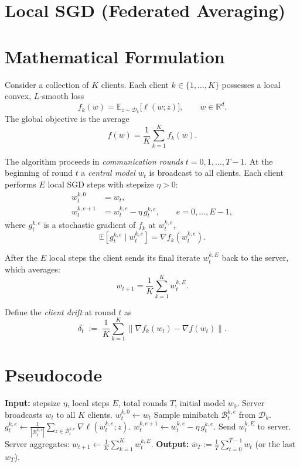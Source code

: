 \documentclass{article}
\newcommand{\E}{\mathbb{E}}
\newcommand{\R}{\mathbb{R}}
\begin{document}
\section*{Local SGD (Federated Averaging)}

\section*{Mathematical Formulation}
Consider a collection of $K$ clients.  Each client $k\in\{1,\dots,K\}$ possesses a local convex, $L$‑smooth loss
\[
f_k(w)=\E_{z\sim\mathcal{D}_k}\big[\ell(w;z)\big],\qquad w\in\R^d .
\]
The global objective is the average
\[
f(w)=\frac1K\sum_{k=1}^K f_k(w).
\]

The algorithm proceeds in \emph{communication rounds} $t=0,1,\dots,T-1$.  
At the beginning of round $t$ a \emph{central model} $w_t$ is broadcast to all clients.  
Each client performs $E$ local SGD steps with stepsize $\eta>0$:
\[
\begin{aligned}
w_{t}^{k,0}&=w_t,\\
w_{t}^{k,e+1}&= w_{t}^{k,e}-\eta\, g_{t}^{k,e},
\qquad e=0,\dots,E-1,
\end{aligned}
\tag{1}
\]
where $g_{t}^{k,e}$ is a stochastic gradient of $f_k$ at $w_{t}^{k,e}$,
\[
\E\!\left[g_{t}^{k,e}\mid w_{t}^{k,e}\right]=\nabla f_k\!\left(w_{t}^{k,e}\right).
\]

After the $E$ local steps the client sends its final iterate $w_{t}^{k,E}$ back to the server, which averages:
\[
w_{t+1}= \frac1K\sum_{k=1}^K w_{t}^{k,E}.
\tag{2}
\]

Define the \emph{client drift} at round $t$ as
\[
\delta_t \;:=\; \frac1K\sum_{k=1}^K\big\|\nabla f_k(w_t)-\nabla f(w_t)\big\|.
\tag{3}
\]

\section*{Pseudocode}
\begin{algorithm}[H]
\caption{Local SGD (FedAvg)}
\begin{algorithmic}[1]
\State \textbf{Input:} stepsize $\eta$, local steps $E$, total rounds $T$, initial model $w_0$.
    \State Server broadcasts $w_t$ to all $K$ clients.
        \State $w_{t}^{k,0}\gets w_t$
            \State Sample minibatch $\mathcal{B}_{t}^{k,e}$ from $\mathcal{D}_k$.
            \State $g_{t}^{k,e}\gets \frac1{|\mathcal{B}_{t}^{k,e}|}\sum_{z\in\mathcal{B}_{t}^{k,e}}\nabla\ell(w_{t}^{k,e};z)$.
            \State $w_{t}^{k,e+1}\gets w_{t}^{k,e}-\eta\, g_{t}^{k,e}$.
        \EndFor
        \State Send $w_{t}^{k,E}$ to server.
    \EndFor
    \State Server aggregates: $w_{t+1}\gets \frac1K\sum_{k=1}^K w_{t}^{k,E}$.
\EndFor
\State \textbf{Output:} $\bar w_T:=\frac1T\sum_{t=0}^{T-1} w_t$ (or the last $w_T$).
\end{algorithmic}
\end{algorithm}
\end{document}
